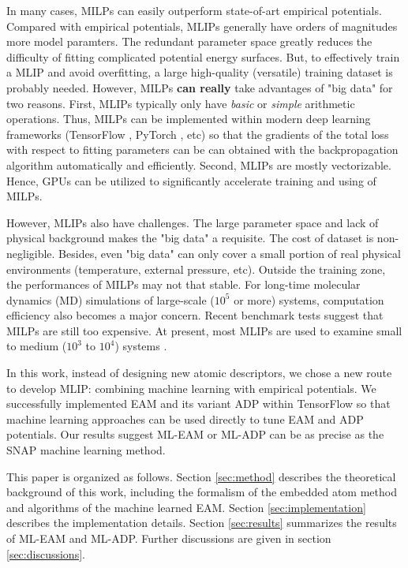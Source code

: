 \documentclass[prb,reprint,superscriptaddress]{revtex4-2}
\begin{document}
In many cases, MILPs can easily outperform state-of-art empirical potentials. 
Compared with empirical potentials, MLIPs generally have orders of magnitudes 
more model paramters. The redundant parameter space greatly reduces the 
difficulty of fitting complicated potential energy surfaces. But, to effectively 
train a MLIP and avoid overfitting, a large high-quality (versatile) training 
dataset is probably needed. However, MILPs \textbf{can really} take advantages 
of "big data" for two reasons. First, MLIPs typically only have 
\textit{basic} or \textit{simple} arithmetic operations. Thus, MILPs can be 
implemented within modern deep learning frameworks 
(TensorFlow \cite{tensorflow}, PyTorch \cite{pytorch}, etc) 
so that the gradients of the total loss with respect to fitting parameters can 
be can obtained with the backpropagation algorithm automatically and 
efficiently. Second, MLIPs are mostly vectorizable. Hence, GPUs can be utilized
to significantly accelerate training and using of MILPs.

However, MLIPs also have challenges. The large parameter space and lack of 
physical background makes the "big data" a requisite. The cost of dataset is 
non-negligible. Besides, even "big data" can only cover a small portion of real 
physical environments (temperature, external pressure, etc). Outside the 
training zone, the performances of MILPs may not that stable. For long-time 
molecular dynamics (MD) simulations of large-scale ($10^5$ or more) systems, 
computation efficiency also becomes a major concern. Recent benchmark 
tests \cite{SnapBenchmark} suggest that MILPs are still too expensive. 
At present, most MLIPs are used to examine small to medium ($10^3$ to $10^4$) 
systems \cite{SNAP,SFApp0,SFApp1,SFApp2,soap3}.

In this work, instead of designing new atomic descriptors, we chose a new route 
to develop MLIP: combining machine learning with empirical potentials. We 
successfully implemented EAM and its variant ADP within TensorFlow so that 
machine learning approaches can be used directly to tune EAM and ADP potentials. 
Our results suggest ML-EAM or ML-ADP can be as precise as the SNAP machine 
learning method. 

This paper is organized as follows. Section \ref{sec:method} describes the 
theoretical background of this work, including the formalism of the embedded 
atom method and algorithms of the machine learned EAM. 
Section \ref{sec:implementation} describes the implementation details.
Section \ref{sec:results} summarizes the results of ML-EAM and ML-ADP. 
Further discussions are given in section \ref{sec:discussions}.
\end{document}
